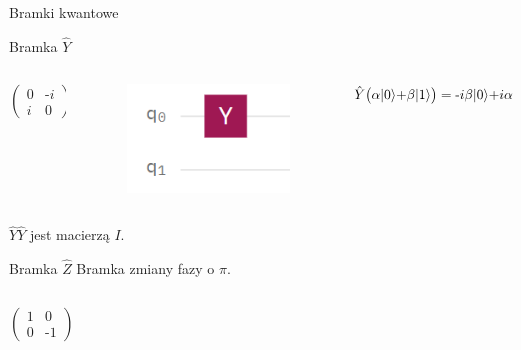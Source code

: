 \documentclass{beamer}
\DeclarePairedDelimiter\ket{\lvert}{\rangle}
\begin{document}
	
	\begin{frame}{Bramki kwantowe}
		\begin{block}{Bramka $\hat{Y}$}
			\vspace{0.5em}
			\begin{columns}
				\begin{column}{0.2\textwidth}
					\begin{flushright}
						$\begin{pmatrix}
						0 & \mbox{-}i\\
						i & 0 
						\end{pmatrix}$	
					\end{flushright}	
				\end{column}
				
				\begin{column}{0.3\textwidth}
					\begin{center}
						\begin{figure}
							\includegraphics[scale=0.5]{media/bramkaY.png}
						\end{figure}
					\end{center}
				\end{column}
				
				\begin{column}{0.5\textwidth}
					\begin{flushleft}
						$\hat{Y}\big(\alpha\ket{0}\mbox{+}\beta\ket{1}\big)=\mbox{-}i\beta\ket{0}\mbox{+}i\alpha\ket{1}$
					\end{flushleft}	
				\end{column}
			\end{columns}
			\vspace{0.5em}
			$\hat{Y}\hat{Y}$ jest macierzą $I$.
			\vspace{0.5em}
		\end{block}	
	
		\begin{block}{Bramka $\hat{Z}$}
			\vspace{0.5em}
			Bramka zmiany fazy o $\pi$.
			\begin{columns}
				\begin{column}{0.2\textwidth}
					\begin{flushright}
						$\begin{pmatrix}
						1 & 0\\
						0 & \mbox{-}1 
						\end{pmatrix}$	
					\end{flushright}	
				\end{column}
				

\end{columns}
\end{block}
\end{frame}
\end{document}
